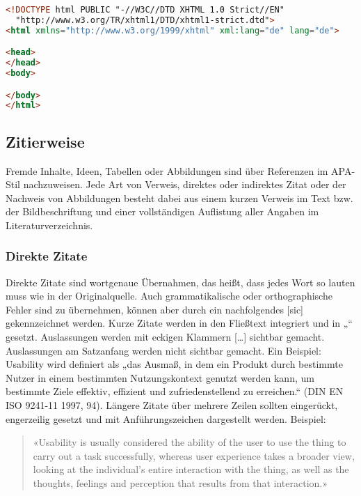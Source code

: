 \begin{lstlisting}[language=HTML,caption={So sieht Code schön aus.},captionpos=b,label=code:arduino_blink]
<!DOCTYPE html PUBLIC "-//W3C//DTD XHTML 1.0 Strict//EN"
  "http://www.w3.org/TR/xhtml1/DTD/xhtml1-strict.dtd">
<html xmlns="http://www.w3.org/1999/xhtml" xml:lang="de" lang="de">

<head>
</head>
<body>

</body>
</html>
\end{lstlisting}


\subsection{Zitierweise}\label{subsec:zitierweise}

Fremde Inhalte, Ideen, Tabellen oder Abbildungen sind über Referenzen im APA-Stil nachzuweisen. Jede Art von Verweis, direktes oder indirektes Zitat oder der Nachweis von Abbildungen besteht dabei aus einem kurzen Verweis im Text bzw. der Bildbeschriftung und einer vollständigen Auflistung aller Angaben im Literaturverzeichnis.

\subsubsection{Direkte Zitate}\label{subsubsec:direkte}

Direkte Zitate sind wortgenaue Übernahmen, das heißt, dass jedes Wort so lauten muss wie in der Originalquelle. Auch grammatikalische oder orthographische Fehler sind zu übernehmen, können aber durch ein nachfolgendes [sic] gekennzeichnet werden. Kurze Zitate werden in den Fließtext integriert und in „“ gesetzt. Auslassungen werden mit eckigen Klammern […] sichtbar gemacht. Auslassungen am Satzanfang werden nicht sichtbar gemacht. Ein Beispiel: Usability wird definiert als „das Ausmaß, in dem ein Produkt durch bestimmte Nutzer in einem bestimmten Nutzungskontext genutzt werden kann, um bestimmte Ziele effektiv, effizient und zufriedenstellend zu erreichen.“ (DIN EN ISO 9241-11 1997, 94). Längere Zitate über mehrere Zeilen sollten eingerückt, engerzeilig gesetzt und mit Anführungszeichen dargestellt werden. Beispiel:


\begin{quote}
«Usability is usually considered the ability of the user to use the thing to carry out a task successfully, whereas user experience takes a broader view, looking at the individual’s entire interaction with the thing, as well as the thoughts, feelings and perception that results from that interaction.»
\cite[S. 4]{albert2013measuring}
\end{quote}

